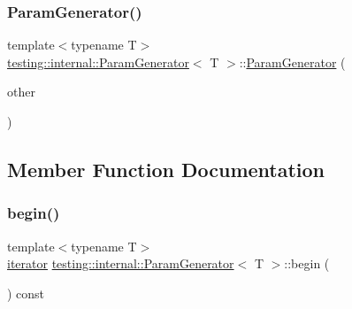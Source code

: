 \subsubsection{\texorpdfstring{ParamGenerator()}{ParamGenerator()}\hspace{0.1cm}{\footnotesize\ttfamily [6/6]}}
{\footnotesize\ttfamily template$<$typename T$>$ \\
\mbox{\hyperlink{classtesting_1_1internal_1_1_param_generator}{testing\+::internal\+::\+Param\+Generator}}$<$ T $>$\+::\mbox{\hyperlink{classtesting_1_1internal_1_1_param_generator}{Param\+Generator}} (\begin{DoxyParamCaption}\item[{const \mbox{\hyperlink{classtesting_1_1internal_1_1_param_generator}{Param\+Generator}}$<$ T $>$ \&}]{other }\end{DoxyParamCaption})\hspace{0.3cm}{\ttfamily [inline]}}



\subsection{Member Function Documentation}
\mbox{\label{classtesting_1_1internal_1_1_param_generator_a14e735c8bd113556ae905a560cd2d607}} 
\subsubsection{\texorpdfstring{begin()}{begin()}\hspace{0.1cm}{\footnotesize\ttfamily [1/3]}}
{\footnotesize\ttfamily template$<$typename T$>$ \\
\mbox{\hyperlink{classtesting_1_1internal_1_1_param_generator_a448b08a8eaae1f1d27840d4dbd66c357}{iterator}} \mbox{\hyperlink{classtesting_1_1internal_1_1_param_generator}{testing\+::internal\+::\+Param\+Generator}}$<$ T $>$\+::begin (\begin{DoxyParamCaption}{ }\end{DoxyParamCaption}) const\hspace{0.3cm}{\ttfamily [inline]}}

\mbox{\label{classtesting_1_1internal_1_1_param_generator_a14e735c8bd113556ae905a560cd2d607}} 
